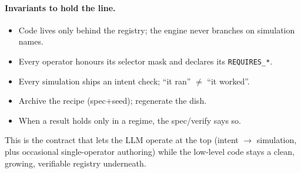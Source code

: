 \documentclass[11pt]{article}
\newcommand{\code}[1]{\texttt{#1}}
\begin{document}
\paragraph{Invariants to hold the line.}
\begin{itemize}\itemsep1pt
\item Code lives only behind the registry; the engine never branches on simulation names.
\item Every operator honours its selector mask and declares its \code{REQUIRES\_*}.
\item Every simulation ships an intent check; ``it ran'' $\neq$ ``it worked''.
\item Archive the recipe (spec$+$seed); regenerate the dish.
\item When a result holds only in a regime, the spec/verify says so.
\end{itemize}

This is the contract that lets the LLM operate at the top (intent $\to$ simulation,
plus occasional single-operator authoring) while the low-level code stays a clean,
growing, verifiable registry underneath.
\end{document}
